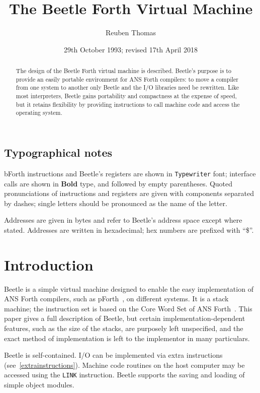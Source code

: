 \documentclass{article}
\title{The Beetle Forth Virtual Machine}
\author{Reuben Thomas}
\date{29th October 1993; revised 17th April 2018}
\newlength{\pronunc}\pronunc=1.7in
\begin{document}
\maketitle

\begin{abstract}
\noindent The design of the Beetle Forth virtual machine is described.
Beetle's purpose is to provide an easily portable environment for ANS Forth
compilers: to move a compiler from one system to another only Beetle and the I/O
libraries need be rewritten. Like most interpreters, Beetle gains portability
and compactness at the expense of speed, but it retains flexibility by providing
instructions to call machine code and access the operating system.
\end{abstract}


\subsection*{Typographical notes}

bForth instructions and Beetle's registers are shown in {\tt Typewriter} font;
interface calls are shown in {\bf Bold} type, and followed by empty parentheses.
Quoted pronunciations of instructions and registers are given with components
separated by dashes; single letters should be pronounced as the name of the
letter.

Addresses are given in bytes and refer to Beetle's address space except where
stated. Addresses are written in hexadecimal; hex numbers are prefixed with
“\$”.


\section{Introduction}

Beetle is a simple virtual machine designed to enable the easy implementation
of ANS Forth compilers, such as pForth~\cite{beetledis}, on different systems. It is a stack machine; the instruction set is based on the Core Word Set of
ANS Forth~\cite{ANSIforth}. This paper gives a full description of Beetle, but
certain implementation-dependent features, such as the size of the stacks, are
purposely left unspecified, and the exact method of implementation is left to
the implementor in many particulars.

Beetle is self-contained. I/O can be implemented via extra instructions (see~\ref{extrainstructions}). Machine
code routines on the host computer may be accessed using the {\tt LINK}
instruction. Beetle supports the saving and loading of simple object modules.
\end{document}
